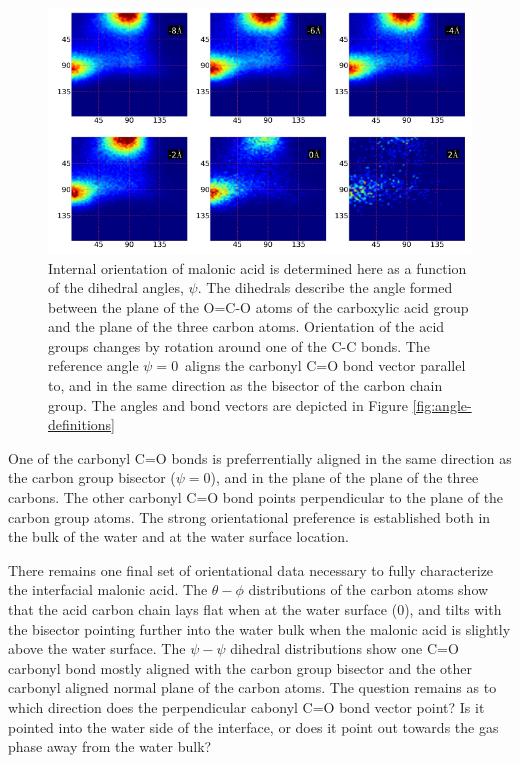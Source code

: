 \begin{figure}[h!]
	\begin{center}
		\includegraphics[scale=1.0]{images/malonic-angles/carboxylic-psi-psi.png}
		\caption{Internal orientation of malonic acid is determined here as a function of the dihedral angles, $\psi$. The dihedrals describe the angle formed between the plane of the O=C-O atoms of the carboxylic acid group  and the plane of the three carbon atoms. Orientation of the acid groups changes by rotation around one of the C-C bonds. The reference angle $\psi=0$\textdegree~aligns the carbonyl C=O bond vector parallel to, and in the same direction as the bisector of the carbon chain group. The angles and bond vectors are depicted in Figure \ref{fig:angle-definitions}}
		\label{fig:carboxylic-psi-psi}
	\end{center}
\end{figure}

One of the carbonyl C=O bonds is preferrentially aligned in the same direction as the carbon group bisector ($\psi=0$\textdegree), and in the plane of the plane of the three carbons. The other carbonyl C=O bond points perpendicular to the plane of the carbon group atoms. The strong orientational preference is established both in the bulk of the water and at the water surface location.

There remains one final set of orientational data necessary to fully characterize the interfacial malonic acid. The $\theta-\phi$ distributions of the carbon atoms show that the acid carbon chain lays flat when at the water surface (0\angs), and tilts with the bisector pointing further into the water bulk when the malonic acid is slightly above the water surface. The $\psi-\psi$ dihedral distributions show one C=O carbonyl bond mostly aligned with the carbon group bisector and the other carbonyl aligned normal plane of the carbon atoms. The question remains as to which direction does the perpendicular cabonyl C=O bond vector point? Is it pointed into the water side of the interface, or does it point out towards the gas phase away from the water bulk?

